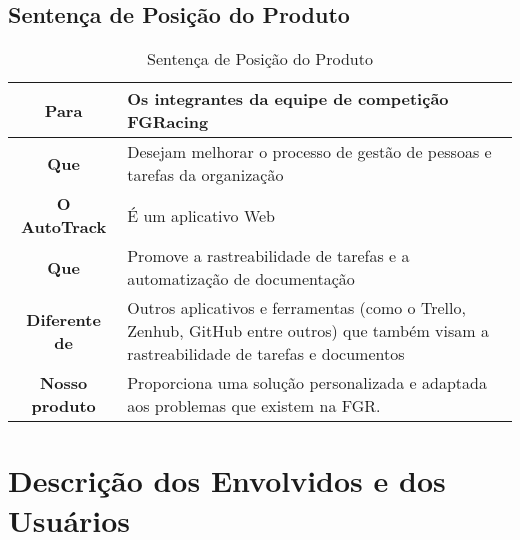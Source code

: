 \begin{apendicesenv}
\subsection{Sentença de Posição do Produto}
\begin{table}[!h]
  \centering
  \caption{Sentença de Posição do Produto}
  \label{my-label}
  \begin{tabular}{|c|l|}
  \hline
  \textbf{Para}          & Os integrantes da equipe de competição FGRacing                                                                                          \\ \hline
  \textbf{Que}           & Desejam melhorar o processo de gestão de pessoas e tarefas da organização                                                                \\ \hline
  \textbf{O AutoTrack}   & É um aplicativo Web                                                                                                                      \\ \hline
  \textbf{Que}           & \parbox[t]{9cm}{Promove a rastreabilidade de tarefas e a automatização de documentação}                                                                   \\ \hline
  \textbf{Diferente de}  & \parbox[t]{9cm}{Outros aplicativos e ferramentas (como o Trello, Zenhub, GitHub entre outros) que também visam a rastreabilidade de tarefas e documentos} \\ \hline
  \textbf{Nosso produto} & \parbox[t]{9cm}{Proporciona uma solução personalizada e adaptada aos problemas que existem na FGR.}                                                       \\ \hline
  \end{tabular}
\end{table}

\pagebreak

\section{Descrição dos Envolvidos e dos Usuários}

\end{apendicesenv}

